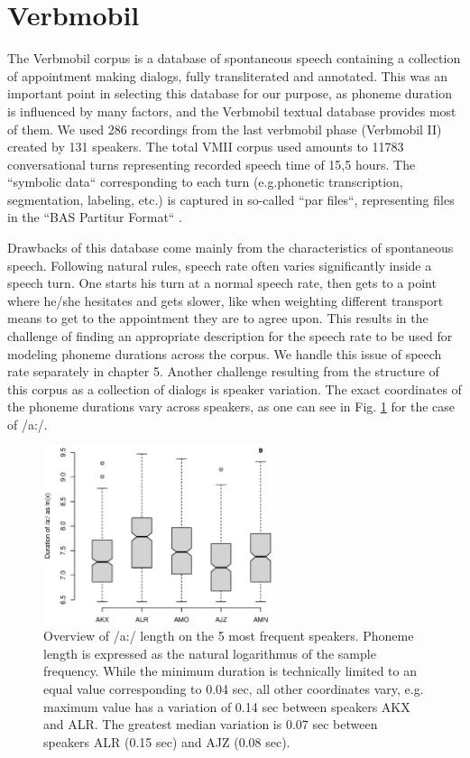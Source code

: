 \documentclass[a4paper]{scrreprt}
\begin{document}
\section{Verbmobil}
The Verbmobil corpus is a database of spontaneous speech containing a collection of appointment making dialogs, fully transliterated and annotated. This was an important point in selecting this database for our purpose, as phoneme duration is influenced by many factors, and the Verbmobil textual database provides most of them. We used 286 recordings from the last verbmobil phase (Verbmobil II) created by 131 speakers. The total VMII corpus used amounts to 11783 conversational turns representing recorded speech time of 15,5 hours. The ``symbolic data`` corresponding to each turn (e.g.phonetic transcription, segmentation, labeling, etc.) is captured in so-called ``par files``, representing files in the ``BAS Partitur Format`` \cite{Burger}. 

Drawbacks of this database come mainly from the characteristics of spontaneous speech. Following natural rules, speech rate often varies significantly inside a speech turn. One starts his turn at a normal speech rate, then gets to a point where he/she hesitates and gets slower, like when weighting different transport means to get to the appointment they are to agree upon. This results in the challenge of finding an appropriate description for the speech rate to be used for modeling phoneme durations across the corpus. We handle this issue of speech rate separately in chapter 5. Another challenge resulting from the structure of this corpus as a collection of dialogs is speaker variation. The exact coordinates of the phoneme durations vary across speakers, as one can see in Fig. \ref{fig:speaker_cmp} for the case of /a:/.

\begin{figure}[htbp]
	\includegraphics[width=0.6\textwidth]{../Graphen/Duration_of_a_5speakers.eps}
	\centering
	\caption[Phoneme length variation between speakers]{Overview of /a:/ length on the 5 most frequent speakers. Phoneme length is expressed as the natural logarithmus of the sample frequency. While the minimum duration is technically limited to an equal value corresponding to 0.04 sec, all other coordinates vary, e.g. maximum value has a variation of 0.14 sec between speakers AKX and ALR. The greatest median variation is 0.07 sec between speakers ALR (0.15 sec) and AJZ (0.08 sec).}
	\label{fig:speaker_cmp}
\end{figure}
\end{document}
